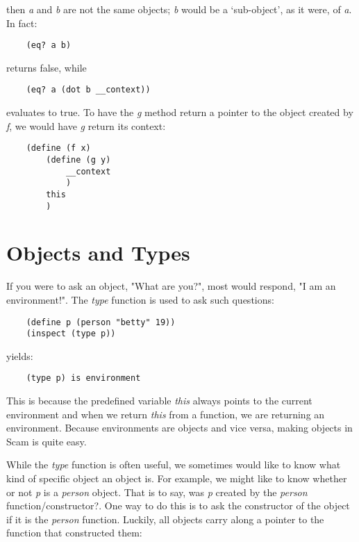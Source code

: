 then {\it a} and {\it b} are not the same objects; {\it b} would
be a `sub-object', as it were, of {\it a}. In fact:

\begin{verbatim}
    (eq? a b)
\end{verbatim}

returns false, while

\begin{verbatim}
    (eq? a (dot b __context))
\end{verbatim}

evaluates to true. To have the {\it g} method return a pointer to the object
created by {\it f}, we would have {\it g} return its context:

\begin{verbatim}
    (define (f x)
        (define (g y)
            __context
            )
        this
        )
\end{verbatim}

\section{Objects and Types}

If you were to ask an object, "What are you?", most
would respond, "I am an environment!". The {\it type} function is
used to ask such questions:

\begin{verbatim}
    (define p (person "betty" 19))
    (inspect (type p))
\end{verbatim}

yields:

\begin{verbatim}
    (type p) is environment
\end{verbatim}

This is because the predefined variable {\it this} always points to
the current environment and when we return {\it this} from a function,
we are returning an environment. Because environments are objects
and vice versa, making objects in Scam is quite easy.

While the {\it type} function is often useful, we sometimes 
would like to know what kind of specific object an object is.
For example, we might like to 
know whether or not {\it p} is a {\it person} object.
That is to say,
was {\it p} created by the {\it person} function/constructor?.
One way to do this
is to ask the constructor of the object if it is the {\it person} function.
Luckily, all objects carry along a pointer to the function
that constructed them:

